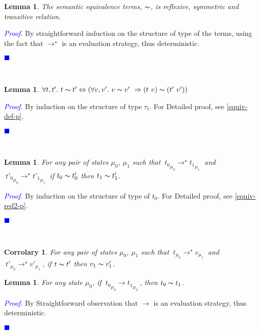 \documentclass[a4paper,11pt,oneside]{article}
\theoremstyle{plain}
\newtheorem{lemma}[definition]{Lemma}
\newtheorem{corr}[definition]{Corrolary}
\renewenvironment{proof}{\noindent \textcolor{blue}{\textit{Proof.}}}
{{\begin{tiny}\textcolor{blue}{$\blacksquare$}\end{tiny}}\\}
\newcommand{\tmapp}[2]{(#1 ~ #2)}
\newcommand{\ty}[1][]{\tau_{#1}}
\newcommand{\evalstep}[4]{~#1_{\mu_#2} \rightarrow #3_{\mu_#4} ~}
\newcommand{\evalstar}[4]{~#1_{\mu_#2} \rightarrow^{\star} #3_{\mu_#4} ~}
\newcommand{\eqv}[1]{#1 \thicksim #1'}
\begin{document}
	\begin{lemma} 
		The semantic equivalence 	terms, $\thicksim$, is reflexive, 	
		symmetric and transitive relation.
	\end{lemma}
	
	\begin{proof}
		By straightforward induction on the structure of type of the terms, using 
		the fact that $\rightarrow^\star$ is an evaluation strategy, thus 
		deterministic.
	\end{proof}

	\begin{lemma}
		$\forall t,t'.~ \eqv{t} \Leftrightarrow 
			(\forall v, v'.~\eqv{v}~\Rightarrow
			\tmapp{t}{v} \thicksim \tmapp{t'}{v'})$
	\label{equiv-def-l}
	\end{lemma}
	
	\begin{proof} By induction on the structure of type $\ty[t]$.
	For Detailed proof, see \ref{equiv-def-p}.
	\end{proof}

	
	\begin{lemma}
		For any pair of states $\mu_0$, $\mu_1$ such that
		$\evalstar{{t_0}}{0}{{t_1}}{1}$ and $\evalstar{{t'_0}}{0}{{t'_1}}{1}$
		if $\eqv{t_0}$ then $\eqv{t_1}$.
		\label{equiv-red2-l}
	\end{lemma}
	
	\begin{proof}
		By induction on the structure of type of $t_0$. 
		For Detailed proof, see \ref{equiv-red2-p}.
	\end{proof}		

	\begin{corr} 
		For any pair of states $\mu_0$, $\mu_1$ such that
		$\evalstar{{t}}{0}{{v}}{1}$ and \mbox{$\evalstar{{t'}}{0}{{v'}}{1}$},
		if $\eqv{t}$ then $\eqv{v_1}$.
		\label{equivalence parallel preservation corr}
	\end{corr}
	
	
	
	\begin{lemma}
		For any state $\mu_0$, if $\evalstep{{t_0}}{0}{{t_1}}{0}$, then
		$t_0 \thicksim t_1$.
	\end{lemma}	
	\begin{proof}
		By Straightforward observation that $\rightarrow$ is an evaluation
		strategy, thus deterministic.
	\end{proof}		
\end{document}
